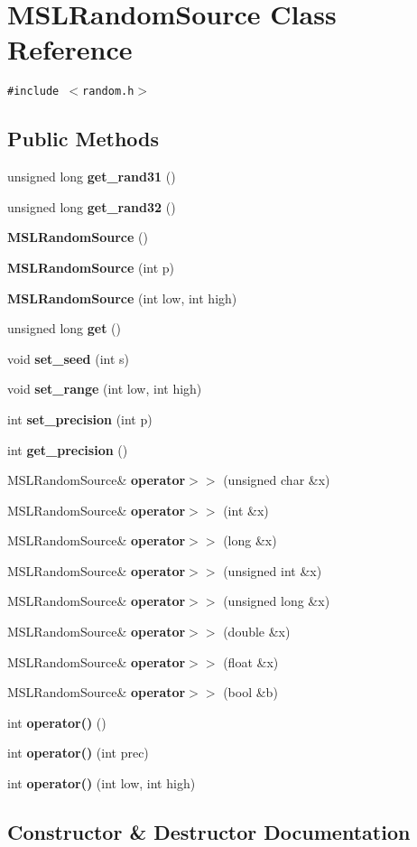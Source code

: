 \section{MSLRandom\-Source  Class Reference}
\label{classMSLRandomSource}
{\tt \#include $<$random.h$>$}

\subsection*{Public Methods}
\begin{CompactItemize}
\item 
unsigned long {\bf get\_\-rand31} ()
\item 
unsigned long {\bf get\_\-rand32} ()
\item 
{\bf MSLRandom\-Source} ()
\item 
{\bf MSLRandom\-Source} (int p)
\item 
{\bf MSLRandom\-Source} (int low, int high)
\item 
unsigned long {\bf get} ()
\item 
void {\bf set\_\-seed} (int s)
\item 
void {\bf set\_\-range} (int low, int high)
\item 
int {\bf set\_\-precision} (int p)
\item 
int {\bf get\_\-precision} ()
\item 
MSLRandom\-Source\& {\bf operator$>$$>$} (unsigned char \&x)
\item 
MSLRandom\-Source\& {\bf operator$>$$>$} (int \&x)
\item 
MSLRandom\-Source\& {\bf operator$>$$>$} (long \&x)
\item 
MSLRandom\-Source\& {\bf operator$>$$>$} (unsigned int \&x)
\item 
MSLRandom\-Source\& {\bf operator$>$$>$} (unsigned long \&x)
\item 
MSLRandom\-Source\& {\bf operator$>$$>$} (double \&x)
\item 
MSLRandom\-Source\& {\bf operator$>$$>$} (float \&x)
\item 
MSLRandom\-Source\& {\bf operator$>$$>$} (bool \&b)
\item 
int {\bf operator()} ()
\item 
int {\bf operator()} (int prec)
\item 
int {\bf operator()} (int low, int high)
\end{CompactItemize}


\subsection{Constructor \& Destructor Documentation}
